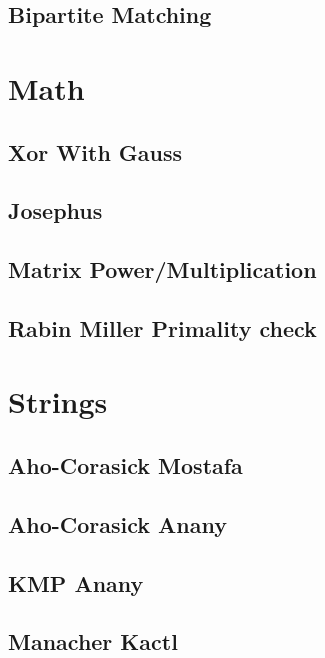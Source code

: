\subsection{Bipartite Matching}
\raggedbottom
\hrulefill

\section{Math}
\subsection{Xor With Gauss}
\raggedbottom
\hrulefill
\subsection{Josephus}
\raggedbottom
\hrulefill
\subsection{Matrix Power/Multiplication}
\raggedbottom
\hrulefill
\subsection{Rabin Miller Primality check}
\raggedbottom
\hrulefill

\section{Strings}
\subsection{Aho-Corasick Mostafa}
\raggedbottom
\hrulefill
\subsection{Aho-Corasick Anany}
\raggedbottom
\hrulefill
\subsection{KMP Anany}
\raggedbottom
\hrulefill
\subsection{Manacher Kactl}
\raggedbottom
\hrulefill
